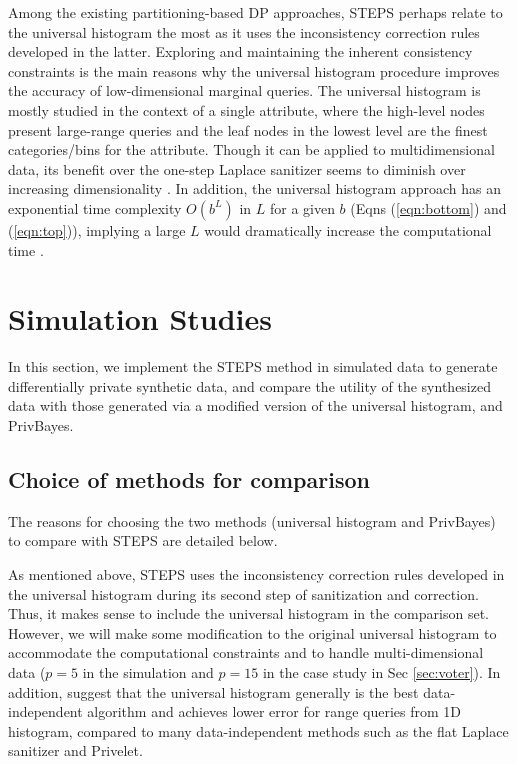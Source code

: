 \documentclass[12pt, A4]{article}
\theoremstyle{plain}
\theoremstyle{exampstyle}\newtheorem{defn}{Definition}
\theoremstyle{exampstyle}\newtheorem{lem}{Lemma}
\theoremstyle{exampstyle}\newtheorem{cor}{Corollary}
\theoremstyle{exampstyle}\newtheorem{pro}{Proposition}
\theoremstyle{exampstyle}\newtheorem{cla}{Claim}
\theoremstyle{exampstyle}\newtheorem{rem}{Remark}
\begin{document}
Among the existing partitioning-based DP approaches, STEPS perhaps relate to the universal histogram the most as it uses the inconsistency correction rules developed in the latter. Exploring and maintaining the inherent consistency constraints is the main reasons why the universal histogram procedure improves the accuracy of low-dimensional marginal queries. The universal histogram is mostly studied in the context of a single attribute, where the high-level nodes present large-range queries and the leaf nodes in the lowest level are the finest categories/bins for the attribute. Though it can be applied to multidimensional data, its benefit over the one-step Laplace sanitizer seems to diminish over increasing dimensionality \citep{qardaji2013understanding,qardaji2013geo}. In addition, the universal histogram approach has an exponential time complexity $O(b^L)$ in $L$ for a given $b$ (Eqns (\ref{eqn:bottom}) and (\ref{eqn:top})), implying a large $L$ would dramatically increase the computational time \citep{qardaji2013understanding}.

\section{Simulation Studies}\label{sec:simulation}
In this section, we implement the STEPS method in simulated data to generate differentially private synthetic data, and compare the utility of the synthesized data with those generated via a modified version of the universal histogram, and PrivBayes. %

\subsection{Choice of methods for comparison}
The reasons for choosing the two methods (universal histogram and PrivBayes) to compare with STEPS are detailed below. 

As mentioned above, STEPS uses the inconsistency correction rules developed in the universal histogram during its second step of sanitization and correction. Thus, it makes sense to include the universal histogram in the comparison set. However, we will make some modification to the original universal histogram to accommodate the computational constraints and to handle multi-dimensional data ($p=5$ in the simulation and $p=15$ in the case study in Sec \ref{sec:voter}). In addition, \citet{qardaji2013understanding} suggest that the universal histogram  generally is the best data-independent algorithm and achieves lower error for range queries from 1D histogram, compared to many data-independent methods such as the flat Laplace sanitizer and Privelet. 
\end{document}
